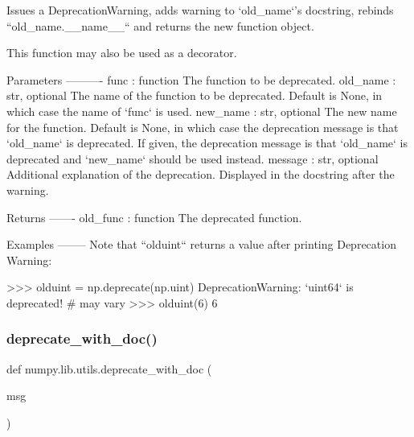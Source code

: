 \begin{DoxyVerb}Issues a DeprecationWarning, adds warning to `old_name`'s
docstring, rebinds ``old_name.__name__`` and returns the new
function object.

This function may also be used as a decorator.

Parameters
----------
func : function
    The function to be deprecated.
old_name : str, optional
    The name of the function to be deprecated. Default is None, in
    which case the name of `func` is used.
new_name : str, optional
    The new name for the function. Default is None, in which case the
    deprecation message is that `old_name` is deprecated. If given, the
    deprecation message is that `old_name` is deprecated and `new_name`
    should be used instead.
message : str, optional
    Additional explanation of the deprecation.  Displayed in the
    docstring after the warning.

Returns
-------
old_func : function
    The deprecated function.

Examples
--------
Note that ``olduint`` returns a value after printing Deprecation
Warning:

>>> olduint = np.deprecate(np.uint)
DeprecationWarning: `uint64` is deprecated! # may vary
>>> olduint(6)
6\end{DoxyVerb}
 \mbox{\label{namespacenumpy_1_1lib_1_1utils_ad068e6779e539248b179200225a11910}} 
\subsubsection{\texorpdfstring{deprecate\+\_\+with\+\_\+doc()}{deprecate\_with\_doc()}}
{\footnotesize\ttfamily def numpy.\+lib.\+utils.\+deprecate\+\_\+with\+\_\+doc (\begin{DoxyParamCaption}\item[{}]{msg }\end{DoxyParamCaption})}

